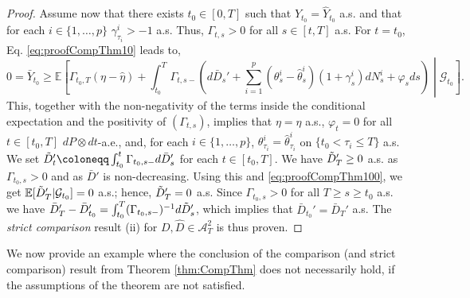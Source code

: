 \documentclass[11pt,a4paper]{article}
\numberwithin{equation}{section}
\theoremstyle{newPlain}
\theoremstyle{newDefinition}
\theoremstyle{newRemark}
\begin{document}
{\begin{proof}
Assume now that there exists $t_0\in[0,T]$ such that $Y_{t_0} = \hat{Y}_{t_0}$ a.s. and that for each $i\in\{1,\ldots,p\}$ $\gamma^i_{\tau_i}>-1$ a.s. Thus,  $\Gamma_{t,s}>0$ for all $ s\in[t,T]$ a.s. For $t=t_0$, Eq. \eqref{eq:proofCompThm10} leads to,
\begin{equation}\label{eq:proofCompThm100}
    0 = \bar{Y}_{t_0} \ge \mathbb{E}\left[\Gamma_{t_0,T}(\eta-\hat{\eta}) + \int_{t_0}^T\Gamma_{t,s-}\left(d\bar{D}_s'+\sum_{i=1}^p(\theta_s^i - \hat{\theta}_s^i)(1+\gamma_s^i)dN_s^i+\varphi_sds\right)\middle|\mathcal{G}_{t_0}\right].
\end{equation}
This, together with the non-negativity of the terms inside the conditional expectation and the positivity of $(\Gamma_{t,s})$, implies that $\eta=\hat{\eta}$ a.s., $\varphi_t=0$ for all $t\in[t_0,T]$ $dP\otimes dt$-a.e., and, for each $i\in\{1,\ldots,p\}$, $\theta_{\tau_i}^i=\hat{\theta}_{\tau_i}^i$ on $\{t_0<\tau_i\le T\}$ a.s. We  set $\Tilde{D}_t'\coloneqq\int_{t_0}^t\Gamma_{t_0,s-}d\bar{D}_s'$ for each $t\in[t_0,T]$. We have $\Tilde{D}_T'\ge0$ a.s. as $\Gamma_{t_0,s}>0$ and as $\bar{D}'$ is non-decreasing. Using this and \eqref{eq:proofCompThm100}, we get $\mathbb{E}[\Tilde{D}_T'|\mathcal{G}_{t_0}]=0$ a.s.; hence, $\Tilde{D}_T'=0$ a.s. Since $\Gamma_{t_0,s}>0$ for all $T\ge s\ge t_0$ a.s. we have $\bar{D}_T' - \bar{D}_{t_0}' = \int_{t_0}^T(\Gamma_{t_0,s-})^{-1}d\Tilde{D}_s'$, which implies that $\bar{D}_{t_0}'=\bar{D}_T'$ a.s. The \emph{strict comparison} result (ii) for $D,\hat{D}\in\mathcal{A}_T^2$ is thus proven.


\end{proof}

We now provide an example where the conclusion of the comparison (and strict comparison) result from Theorem \ref{thm:CompThm} does not necessarily hold, if the assumptions of the theorem are not satisfied. 



}
\end{document}
